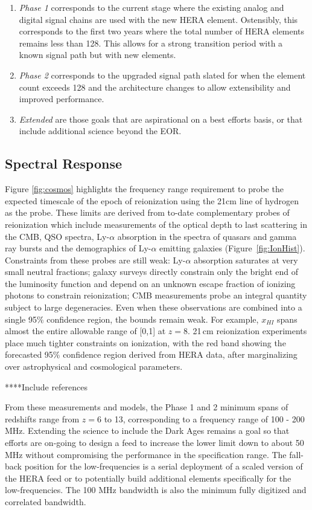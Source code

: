 \documentclass{article}
\begin{document}
\begin{enumerate}
\item {\em Phase 1} corresponds to the current stage where the existing analog and digital signal chains are used with the new HERA element.  Ostensibly, this corresponds to the first two years where the total number of HERA elements remains less than 128.  This allows for a strong transition period with a known signal path but with new elements.
\item {\em Phase 2} corresponds to the upgraded signal path slated for when the element count exceeds 128 and the architecture changes to allow extensibility and improved performance.
\item {\em Extended} are those goals that are aspirational on a best efforts basis, or that include additional science beyond the EOR.
\end{enumerate}

\subsection{Spectral Response}
Figure \ref{fig:cosmos} highlights the frequency range requirement to probe the expected timescale of the epoch of reionization using the 21cm line of hydrogen as the probe.  
These limits are derived from to-date complementary probes of reionization which include measurements of
the optical depth to last scattering in the CMB, QSO spectra, Ly-$\alpha$
absorption in the spectra of quasars and gamma ray bursts and the demographics
of Ly-$\alpha$ emitting galaxies
(Figure~\ref{fig:IonHist}). 
Constraints from these probes are still weak:
Ly-$\alpha$ absorption saturates at very small neutral fractions; galaxy
surveys directly constrain only the bright end of the luminosity function and
depend on an unknown escape fraction of ionizing photons to constrain
reionization; CMB measurements probe an integral quantity subject
to large degeneracies. Even when these observations are
combined into a single 95\% confidence region, the bounds remain weak.
For example, $x_{HI}$ spans almost the entire allowable range of [0,1]
at $z=8$. 21\,cm reionization experiments place much tighter constraints on ionization, with the
red band showing the forecasted 95\% confidence region derived from HERA data,
after marginalizing over astrophysical and cosmological parameters.

****Include references

From these measurements and models, the Phase 1 and 2 minimum spans of redshifts range from $z=$6 to 13, corresponding to a frequency range of 100 - 200 MHz.  Extending the science to include the Dark Ages remains a goal so that efforts are on-going to design a feed to increase the lower limit down to about 50 MHz without compromising the performance in the specification range.  The fall-back position for the low-frequencies is a serial deployment of a scaled version of the HERA feed or to potentially build additional elements specifically for the low-frequencies.  The 100 MHz bandwidth is also the minimum fully digitized and correlated bandwidth.
\end{document}
